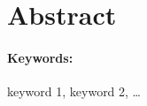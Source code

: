 \section*{Abstract}\thispagestyle{empty}
    \label{chap:abstract}
    
    \Blindtext[4]
    
    \vfill
\paragraph*{Keywords:} keyword 1, keyword 2, \dots
{}
